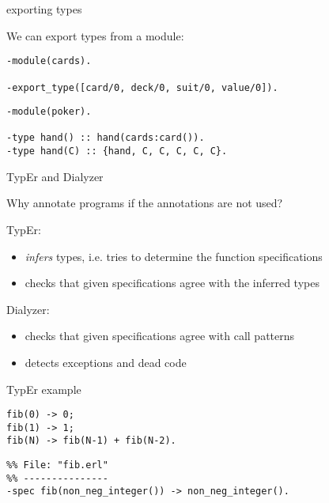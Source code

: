 \begin{frame}[fragile]{exporting types}

We can export types from a module:

\begin{verbatim}
-module(cards).

-export_type([card/0, deck/0, suit/0, value/0]).
\end{verbatim}

\pause\vspace{20pt}

\begin{verbatim}
-module(poker).

-type hand() :: hand(cards:card()).
-type hand(C) :: {hand, C, C, C, C, C}.

\end{verbatim}

\end{frame}


\begin{frame}{TypEr and Dialyzer}

Why annotate programs if the annotations are not used?

\pause\vspace{20pt}

TypEr:  
\begin{itemize}
\item {\em infers} types, i.e. tries to determine the function specifications
\pause
\item checks that given specifications agree with the inferred types
\end{itemize}

Dialyzer:

\begin{itemize}
\item checks that given specifications agree with call patterns
\pause
\item detects exceptions and dead code 
\end{itemize}


\end{frame}

\begin{frame}[fragile]{TypEr example}

\begin{verbatim}
fib(0) -> 0;
fib(1) -> 1;
fib(N) -> fib(N-1) + fib(N-2).
\end{verbatim}

\pause
\begin{verbatim}
%% File: "fib.erl"
%% ---------------
-spec fib(non_neg_integer()) -> non_neg_integer().
\end{verbatim}


\end{frame}

